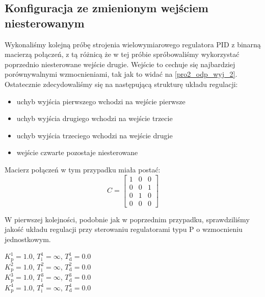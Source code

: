 \subsection{Konfiguracja ze zmienionym wejściem niesterowanym}
\label{pro_pid_konf2}

Wykonaliśmy kolejną próbę strojenia wielowymiarowego regulatora PID 
z binarną macierzą połączeń, z tą różnicą że w tej próbie spróbowaliśmy 
wykorzystać poprzednio niesterowane wejście drugie. Wejście to cechuje się 
najbardziej porównywalnymi wzmocnieniami, tak jak to widać na \ref{pro2_odp_wyj_2}.
Ostatecznie zdecydowaliśmy się na następującą strukturę układu regulacji:

\begin{itemize}
    \item uchyb wyjścia pierwszego wchodzi na wejście pierwsze
    \item uchyb wyjścia drugiego wchodzi na wejście trzecie
    \item uchyb wyjścia trzeciego wchodzi na wejście drugie
    \item wejście czwarte pozostaje niesterowane
\end{itemize}

\noindent Macierz połączeń w tym przypadku miała postać: \\

\[
C =
\begin{bmatrix}
    1 & 0 & 0 \\
    0 & 0 & 1 \\
    0 & 1 & 0 \\
    0 & 0 & 0 
\end{bmatrix}
\]

W pierwszej kolejności, podobnie jak w poprzednim przypadku, sprawdziliśmy 
jakość układu regulacji przy sterowaniu regulatorami typu P o wzmocnieniu 
jednostkowym. 

\begin{center}
    $K^{\num{1}}_{\mathrm{p}} = \num{1.0}$, $T^{\num{1}}_{\mathrm{i}} = \infty$, $T^{\num{1}}_{\mathrm{d}} = \num{0.0}$ \\
    $K^{\num{2}}_{\mathrm{p}} = \num{1.0}$, $T^{\num{2}}_{\mathrm{i}} = \infty$, $T^{\num{2}}_{\mathrm{d}} = \num{0.0}$ \\
    $K^{\num{3}}_{\mathrm{p}} = \num{1.0}$, $T^{\num{3}}_{\mathrm{i}} = \infty$, $T^{\num{3}}_{\mathrm{d}} = \num{0.0}$ \\
    $K^{\num{4}}_{\mathrm{p}} = \num{1.0}$, $T^{\num{4}}_{\mathrm{i}} = \infty$, $T^{\num{4}}_{\mathrm{d}} = \num{0.0}$ \\
\end{center}

